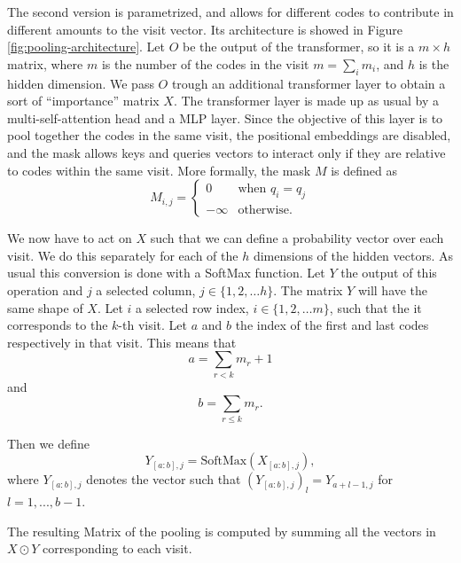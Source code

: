 \documentclass[]{marticle}
\begin{document}
The second version is parametrized, and allows for different codes to contribute in different
amounts to the visit vector. Its architecture is showed in Figure \ref{fig:pooling-architecture}.
Let $O$ be the output of the transformer, so it is a $m \times h$ matrix, where $m$ is the number of
the codes in the visit $m=\sum_i m_i$, and $h$ is the hidden dimension. We pass $O$ trough an
additional transformer layer to obtain a sort of ``importance'' matrix $X$. The transformer layer is
made up as usual by a multi-self-attention head and a MLP layer. Since the objective of this layer
is to pool together the codes in the same visit, the positional embeddings are disabled, and the
mask allows keys and queries vectors to interact only if they are relative to codes within the same
visit. More formally, the mask $M$ is defined as 
\begin{equation*}
    M_{i,j} = \begin{cases}
        0       & \text{when $q_i = q_j$} \\
        -\infty & \text{otherwise.}
    \end{cases}
\end{equation*}

We now have to act on $X$ such that we can define a probability vector over each visit. We do this
separately for each of the $h$ dimensions of the hidden vectors. As usual this conversion is done
with a SoftMax function. Let $Y$ the output of this operation and $j$ a selected column,
$j\in\{1,2,\dots h\}$. The matrix $Y$ will have the same shape of $X$. Let $i$ a selected row index,
$i\in \{1,2,\dots m\}$, such that the it corresponds to the $k$-th visit. Let $a$ and $b$ the index
of the first and last codes respectively in that visit. This means that 
\begin{equation*}
    a = \sum_{r < k} m_r + 1
\end{equation*}
and 
\begin{equation*}
    b = \sum_{r \leq k} m_r.
\end{equation*}

Then we define
\begin{equation*}
   Y_{[a:b], j} = \text{SoftMax}(X_{[a:b], j}),
\end{equation*}
where $Y_{[a:b], j}$ denotes the vector such that $(Y_{[a:b], j})_l = Y_{a+l-1, j}$ for ${{l=1,..., b-1}}$.

The resulting Matrix of the pooling is computed by summing all the vectors in $X\odot Y$
corresponding to each visit.
\end{document}
